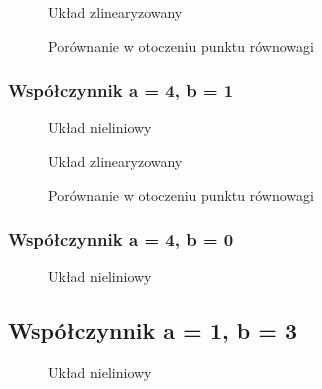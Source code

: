 \documentclass[a4paper, 10pt]{article}
\begin{document}
				\begin{figure}[H]
					\centering
					\def \svgwidth{0.75\columnwidth}
					
					\caption{Układ zlinearyzowany}
				\end{figure}\noindent


				\begin{figure}[H]
					\centering
					\def \svgwidth{0.75\columnwidth}
					
					\caption{Porównanie w otoczeniu punktu równowagi}
				\end{figure}\noindent

			\subsubsection{Współczynnik a = 4, b = 1}
				\begin{figure}[H]
					\centering
					\def \svgwidth{0.75\columnwidth}
					
					\caption{Układ nieliniowy}
				\end{figure}\noindent


				\begin{figure}[H]
					\centering
					\def \svgwidth{0.75\columnwidth}
					
					\caption{Układ zlinearyzowany}
				\end{figure}\noindent



				\begin{figure}[H]
					\centering
					\def \svgwidth{0.75\columnwidth}
					
					\caption{Porównanie w otoczeniu punktu równowagi}
				\end{figure}\noindent

			\subsubsection{Współczynnik a = 4, b = 0}
				\begin{figure}[H]
					\centering
					\def \svgwidth{0.75\columnwidth}
					
					\caption{Układ nieliniowy}
				\end{figure}\noindent

			\subsection{Współczynnik a = 1, b = 3}
				\begin{figure}[H]
					\centering
					\def \svgwidth{0.75\columnwidth}
					
					\caption{Układ nieliniowy}
				\end{figure}\noindent
\end{document}
